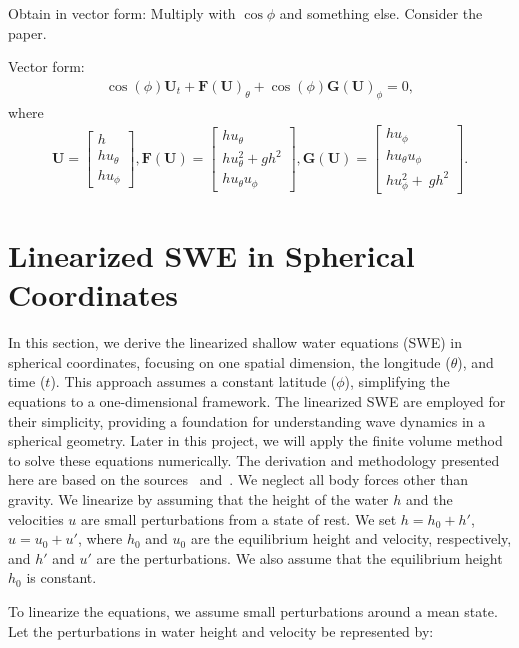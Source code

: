 Obtain in vector form:
Multiply with $\cos \phi$ and something else. Consider the paper.

Vector form:
\begin{align}
    \cos(\phi) \mathbf{U}_t + \mathbf{F(U)}_\theta + \cos(\phi) \mathbf{G(U)}_\phi = 0,
\end{align}
where 
\begin{align*}
    \mathbf{U} = \begin{bmatrix} h \\ h u_\theta \\h u_\phi \end{bmatrix},
    \mathbf{F(U)} = \begin{bmatrix} h u_\theta \\ h u_\theta^2 + g h^2  \\ h u_\theta u_\phi \end{bmatrix},
    \mathbf{G(U)} = \begin{bmatrix} h u_\phi \\ h u_\theta u_\phi \\ h u_\phi^2 + \ g h^2 \end{bmatrix}.
\end{align*}



\section{Linearized SWE in Spherical Coordinates}
In this section, we derive the linearized shallow water equations (SWE) in spherical coordinates, focusing on one spatial dimension, the longitude ($\theta$), and time ($t$).
This approach assumes a constant latitude ($\phi$), simplifying the equations to a one-dimensional framework.
The linearized SWE are employed for their simplicity, providing a foundation for understanding wave dynamics in a spherical geometry.
Later in this project, we will apply the finite volume method to solve these equations numerically.
The derivation and methodology presented here are based on the sources~\cite{BONEV_2018} and~\cite{Eskilsson_2005}.
We neglect all body forces other than gravity.
We linearize by assuming that the height of the water $h$ and the velocities $u$ are small perturbations from a state of rest.
We set $h = h_0 + h'$, $u = u_0 + u'$, where $h_0$ and $u_0$ are the equilibrium height and velocity, respectively, and $h'$ and $u'$ are the perturbations.
We also assume that the equilibrium height $h_0$ is constant.

To linearize the equations, we assume small perturbations around a mean state. Let the perturbations in water height and velocity be represented by:

